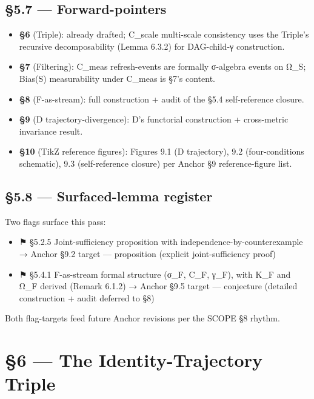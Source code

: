 \documentclass[11pt, openany]{book}
\newcommand{\sectionbreak}{\clearpage}
\begin{document}
\sectionbreak

\section{§5.7 --- Forward-pointers}

\begin{itemize}
\item \textbf{§6} (Triple): already drafted; C\_\allowbreak{}scale multi-scale consistency uses the Triple's recursive decomposability (Lemma 6.3.2) for DAG-child-γ construction.
\item \textbf{§7} (Filtering): C\_\allowbreak{}meas refresh-events are formally σ-algebra events on Ω\_\allowbreak{}S; Bias(S) measurability under C\_\allowbreak{}meas is §7's content.
\item \textbf{§8} (F-as-stream): full construction + audit of the §5.4 self-reference closure.
\item \textbf{§9} (D trajectory-divergence): D's functorial construction + cross-metric invariance result.
\item \textbf{§10} (TikZ reference figures): Figures 9.1 (D trajectory), 9.2 (four-conditions schematic), 9.3 (self-reference closure) per Anchor §9 reference-figure list.
\end{itemize}

\sectionbreak

\section{§5.8 --- Surfaced-lemma register}

Two flags surface this pass:

\begin{itemize}
\item ⚑ §5.2.5 Joint-sufficiency proposition with independence-by-counterexample → Anchor §9.2 target --- proposition (explicit joint-sufficiency proof)
\item ⚑ §5.4.1 F-as-stream formal structure (σ\_\allowbreak{}F, C\_\allowbreak{}F, γ\_\allowbreak{}F), with K\_\allowbreak{}F and Ω\_\allowbreak{}F derived (Remark 6.1.2) → Anchor §9.5 target --- conjecture (detailed construction + audit deferred to §8)
\end{itemize}

Both flag-targets feed future Anchor revisions per the SCOPE §8 rhythm.

\sectionbreak


\chapter{§6 — The Identity-Trajectory Triple}
\end{document}
